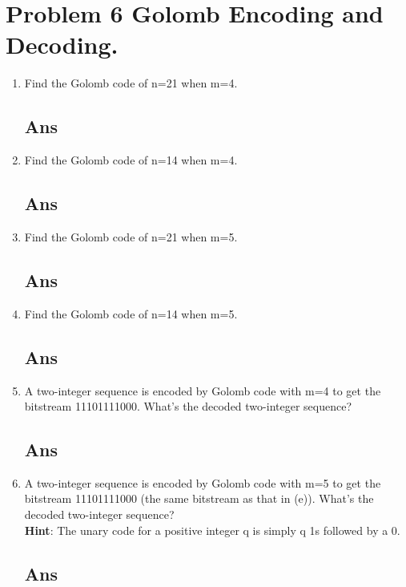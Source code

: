 \documentclass[a4paper, 11pt]{article}
\begin{document}
\section*{Problem 6 Golomb Encoding and Decoding.}
\begin{enumerate}[label=(\alph*)]
  \item Find the Golomb code of n=21 when m=4.
  \subsection*{Ans}
  \item Find the Golomb code of n=14 when m=4.
  \subsection*{Ans}
  \item Find the Golomb code of n=21 when m=5.
  \subsection*{Ans}
  \item Find the Golomb code of n=14 when m=5.
  \subsection*{Ans}
  \item A two-integer sequence is encoded by Golomb code with m=4 to get the bitstream
  11101111000. What’s the decoded two-integer sequence?
  \subsection*{Ans}
  \item A two-integer sequence is encoded by Golomb code with m=5 to get the bitstream
  11101111000 (the same bitstream as that in (e)). What’s the decoded two-integer sequence?\\
  \textbf{Hint}: The unary code for a positive integer q is simply q 1s followed by a 0.
  \subsection*{Ans}
\end{enumerate}
\end{document}
